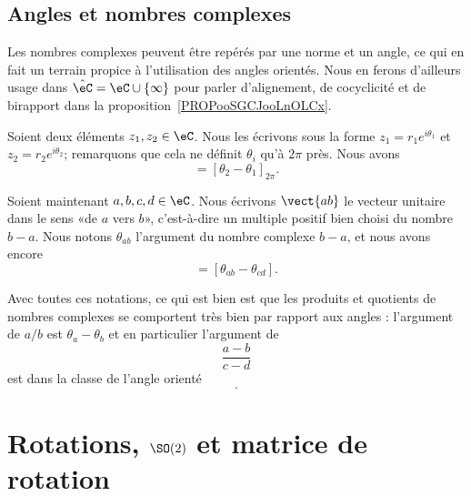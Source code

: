 \subsection{Angles et nombres complexes}
\label{SUBSECooKNUVooUBKaWm}

Les nombres complexes peuvent être repérés par une norme et un angle, ce qui en fait un terrain propice à l'utilisation des angles orientés. Nous en ferons d'ailleurs usage dans \( \hat\eC=\eC\cup\{ \infty \}\) pour parler d'alignement, de cocyclicité et de birapport dans la proposition~\ref{PROPooSGCJooLnOLCx}.

Soient deux éléments \( z_1,z_2\in \eC\). Nous les écrivons sous la forme \( z_1=r_1 e^{i\theta_1}\) et \( z_2=r_2 e^{i\theta_2}\); remarquons que cela ne définit \( \theta_i\) qu'à \( 2\pi\) près. Nous avons
\begin{equation}
    [z_1,z_2]=[\theta_2-\theta_1]_{2\pi}.
\end{equation}

Soient maintenant \( a,b,c,d\in \eC\). Nous écrivons \( \vect{ ab }\) le vecteur unitaire dans le sens «de \( a\) vers \( b\)», c'est-à-dire un multiple positif bien choisi du nombre \( b-a\). Nous notons \( \theta_{ab}\) l'argument du nombre complexe \( b-a\), et nous avons encore
\begin{equation}
    [\vect{ ab },\vect{ cd }]=[\theta_{ab}-\theta_{cd}].
\end{equation}

Avec toutes ces notations, ce qui est bien est que les produits et quotients de nombres complexes se comportent très bien par rapport aux angles : l'argument de \( a/b\) est \( \theta_a-\theta_b\) et en particulier l'argument de
\begin{equation}
    \frac{ a-b }{ c-d }
\end{equation}
est dans la classe de l'angle orienté
\begin{equation}
    [\vect{ ba },\vect{ dc }].
\end{equation}


\section{Rotations, \( \SO(2)\) et matrice de rotation}

